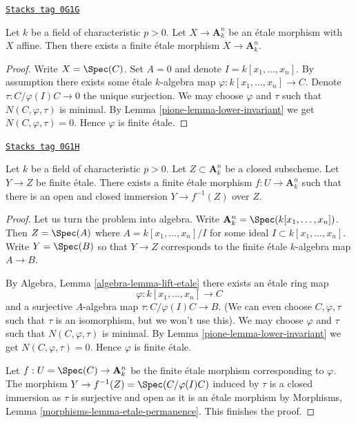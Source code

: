 \begin{lemma}
\label{pione-lemma-affine-etale-over-affine-space}
\href{https://stacks.math.columbia.edu/tag/0G1G}{\texttt{Stacks tag 0G1G}}

Let $k$ be a field of characteristic $p > 0$. Let $X \to \mathbf{A}^n_k$ be an
\'etale morphism with $X$ affine. Then there exists a finite \'etale
morphism $X \to \mathbf{A}^n_k$.
\end{lemma}

\begin{proof}

Write $X = \Spec(C)$. Set $A = 0$ and denote $I = k[x_1, \ldots, x_n]$.
By assumption there exists some \'etale $k$-algebra map
$\varphi : k[x_1, \ldots, x_n] \to C$. Denote $\tau : C/\varphi(I)C \to 0$
the unique surjection. We may choose $\varphi$ and $\tau$ such
that $N(C, \varphi, \tau)$ is minimal. By Lemma \ref{pione-lemma-lower-invariant}
we get $N(C, \varphi, \tau) = 0$. Hence $\varphi$ is finite \'etale.
\end{proof}

\begin{lemma}
\label{pione-lemma-dominate-affine-space}
\href{https://stacks.math.columbia.edu/tag/0G1H}{\texttt{Stacks tag 0G1H}}

Let $k$ be a field of characteristic $p > 0$. Let $Z \subset \mathbf{A}^n_k$
be a closed subscheme. Let $Y \to Z$ be finite \'etale. There exists a
finite \'etale morphism $f : U \to \mathbf{A}^n_k$ such that
there is an open and closed immersion $Y \to f^{-1}(Z)$ over $Z$.
\end{lemma}

\begin{proof}

Let us turn the problem into algebra. Write
$\mathbf{A}^n_k = \Spec(k[x_1, \ldots, x_n])$.
Then $Z = \Spec(A)$ where $A = k[x_1, \ldots, x_n]/I$
for some ideal $I \subset k[x_1, \ldots, x_n]$.
Write $Y = \Spec(B)$ so that $Y \to Z$ corresponds to
the finite \'etale $k$-algebra map $A \to B$.

\medskip\noindent
By Algebra, Lemma \ref{algebra-lemma-lift-etale}
there exists an \'etale ring map
$$
\varphi : k[x_1, \ldots, x_n] \to C
$$
and a surjective $A$-algebra map $\tau : C/\varphi(I)C \to B$.
(We can even choose $C, \varphi, \tau$ such that $\tau$ is an isomorphism,
but we won't use this). We may choose $\varphi$ and $\tau$ such
that $N(C, \varphi, \tau)$ is minimal. By Lemma \ref{pione-lemma-lower-invariant}
we get $N(C, \varphi, \tau) = 0$. Hence $\varphi$ is finite \'etale.

\medskip\noindent
Let $f : U = \Spec(C) \to \mathbf{A}^n_k$ be the finite \'etale
morphism corresponding to $\varphi$. The morphism
$Y \to f^{-1}(Z) = \Spec(C/\varphi(I)C)$ induced by $\tau$
is a closed immersion as $\tau$ is surjective and open as
it is an \'etale morphism by Morphisms, Lemma
\ref{morphisms-lemma-etale-permanence}. This finishes the proof.
\end{proof}

